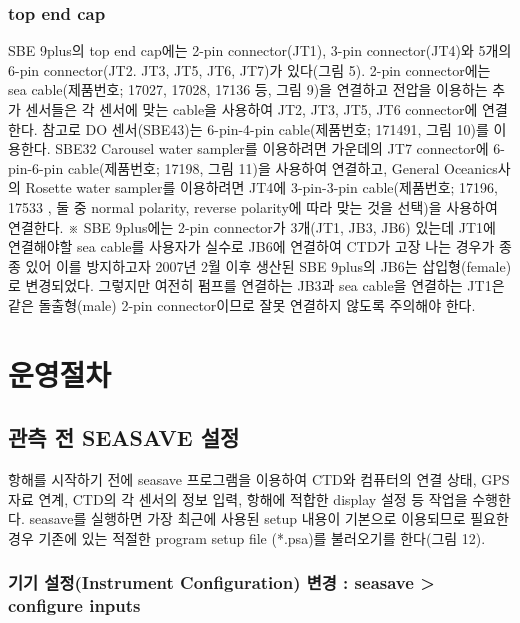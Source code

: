 \documentclass[
]{book}
\begin{document}
\hypertarget{top-end-cap}{%
\subsubsection{top end cap}\label{top-end-cap}}

SBE 9plus의 top end cap에는 2-pin connector(JT1), 3-pin connector(JT4)와 5개의 6-pin connector(JT2. JT3, JT5, JT6, JT7)가 있다(그림 5). 2-pin connector에는 sea cable(제품번호; 17027, 17028, 17136 등, 그림 9)을 연결하고 전압을 이용하는 추가 센서들은 각 센서에 맞는 cable을 사용하여 JT2, JT3, JT5, JT6 connector에 연결한다. 참고로 DO 센서(SBE43)는 6-pin-4-pin cable(제품번호; 171491, 그림 10)를 이용한다. SBE32 Carousel water sampler를 이용하려면 가운데의 JT7 connector에 6-pin-6-pin cable(제품번호; 17198, 그림 11)을 사용하여 연결하고, General Oceanics사의 Rosette water sampler를 이용하려면 JT4에 3-pin-3-pin cable(제품번호; 17196, 17533 , 둘 중 normal polarity, reverse polarity에 따라 맞는 것을 선택)을 사용하여 연결한다.
※ SBE 9plus에는 2-pin connector가 3개(JT1, JB3, JB6) 있는데 JT1에 연결해야할 sea cable를 사용자가 실수로 JB6에 연결하여 CTD가 고장 나는 경우가 종종 있어 이를 방지하고자 2007년 2월 이후 생산된 SBE 9plus의 JB6는 삽입형(female)로 변경되었다. 그렇지만 여전히 펌프를 연결하는 JB3과 sea cable을 연결하는 JT1은 같은 돌출형(male) 2-pin connector이므로 잘못 연결하지 않도록 주의해야 한다.

\hypertarget{uxc6b4uxc601uxc808uxcc28}{%
\section{운영절차}\label{uxc6b4uxc601uxc808uxcc28}}

\hypertarget{uxad00uxce21-uxc804-seasave-uxc124uxc815}{%
\subsection{관측 전 SEASAVE 설정}\label{uxad00uxce21-uxc804-seasave-uxc124uxc815}}

항해를 시작하기 전에 seasave 프로그램을 이용하여 CTD와 컴퓨터의 연결 상태, GPS 자료 연계, CTD의 각 센서의 정보 입력, 항해에 적합한 display 설정 등 작업을 수행한다. seasave를 실행하면 가장 최근에 사용된 setup 내용이 기본으로 이용되므로 필요한 경우 기존에 있는 적절한 program setup file (*.psa)를 불러오기를 한다(그림 12).

\hypertarget{uxae30uxae30-uxc124uxc815instrument-configuration-uxbcc0uxacbd-seasave-configure-inputs}{%
\subsubsection{기기 설정(Instrument Configuration) 변경 : seasave \textgreater{} configure inputs}\label{uxae30uxae30-uxc124uxc815instrument-configuration-uxbcc0uxacbd-seasave-configure-inputs}}
\end{document}
